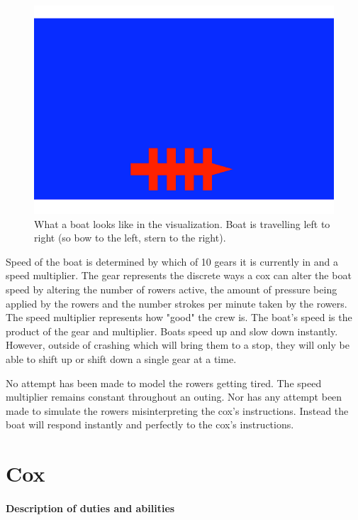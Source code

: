       \begin{figure}[h]
      \begin{center}
      	\includegraphics[scale=0.3]{images/boat.png}
      	\caption{What a boat looks like in the visualization. Boat is travelling left to right (so bow to the left, stern to the right).}
      	\label{fig:model:boat}
      \end{center}
      \end{figure}
      
      Speed of the boat is determined by which of 10 gears it is currently in and a speed multiplier. The gear represents the discrete ways a cox can alter the boat speed by altering the number of rowers active, the amount of pressure being applied by the rowers and the number strokes per minute taken by the rowers. The speed multiplier represents how "good" the crew is. The boat's speed is the product of the gear and multiplier. Boats speed up and slow down instantly. However, outside of crashing which will bring them to a stop, they will only be able to shift up or shift down a single gear at a time.
      
      No attempt has been made to model the rowers getting tired. The speed multiplier remains constant throughout an outing. Nor has any attempt been made to simulate the rowers misinterpreting the cox's instructions. Instead the boat will respond instantly and perfectly to the cox's instructions.
      
    \section{Cox}
      \paragraph{Description of duties and abilities}
